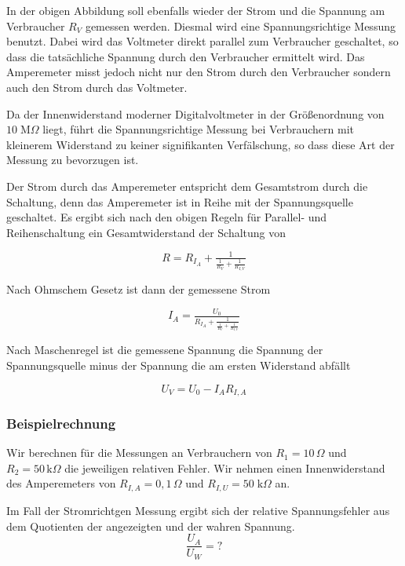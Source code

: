 \documentclass[a4paper,german,12pt,smallheadings]{scrartcl}
\begin{document}
In der obigen Abbildung soll ebenfalls wieder der Strom und die Spannung am
Verbraucher $R_V$ gemessen werden. Diesmal wird eine Spannungsrichtige Messung
benutzt. Dabei wird das Voltmeter direkt parallel zum Verbraucher geschaltet,
so dass die tatsächliche Spannung durch den Verbraucher ermittelt wird. Das
Amperemeter misst jedoch nicht nur den Strom durch den Verbraucher sondern auch
den Strom durch das Voltmeter.

Da der Innenwiderstand moderner Digitalvoltmeter in der Größenordnung von $10
\;\text{M}\Omega$ liegt, führt die Spannungsrichtige Messung bei Verbrauchern
mit kleinerem Widerstand zu keiner signifikanten Verfälschung, so dass diese
Art der Messung zu bevorzugen ist.

Der Strom durch das Amperemeter entspricht dem Gesamtstrom durch die Schaltung,
denn das Amperemeter ist in Reihe mit der Spannungsquelle geschaltet. Es ergibt
sich nach den obigen Regeln für Parallel- und Reihenschaltung ein
Gesamtwiderstand der Schaltung von

\begin{equation}
  R = R_{I_A} + \tfrac{1}{\tfrac{1}{R_V} + \tfrac{1}{R_{I,V}}}
\end{equation}

Nach Ohmschem Gesetz ist dann der gemessene Strom

\begin{equation}
  I_A = \tfrac{U_0}{R_{I_A} + \tfrac{1}{\tfrac{1}{R_V} + \tfrac{1}{R_{I,V}}}}
\end{equation}

Nach Maschenregel ist die gemessene Spannung die Spannung der Spannungsquelle
minus der Spannung die am ersten Widerstand abfällt

\begin{equation}
  U_V = U_0 - I_A R_{I,A}
\end{equation}

\subsubsection{Beispielrechnung}

Wir berechnen für die Messungen an Verbrauchern von $R_1 = 10 \, \Omega$ und
$R_2 = 50\,\text{k}\Omega$ die jeweiligen relativen Fehler. Wir nehmen einen
Innenwiderstand des Amperemeters von $R_{I,A} = 0{,}1\,\Omega$ und $R_{I,U} =
50\;\text{k}\Omega$ an.

Im Fall der Stromrichtgen Messung ergibt sich der relative Spannungsfehler aus
dem Quotienten der angezeigten und der wahren Spannung.
\begin{equation}
  \frac{U_A}{U_W} = ?
\end{equation}
\end{document}
